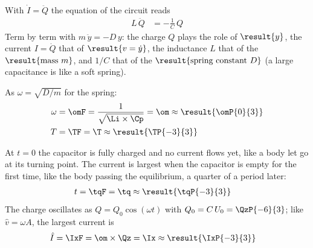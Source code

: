 \begin{abcliste}
\abc With $\dot I = \ddot Q$ the equation of the circuit reads
\begin{align}
 L\,\ddot Q &= -\frac{1}{C}\,Q
\end{align}
Term by term with $m\,\ddot y = -D\,y$: the charge $Q$ plays the role of $\result{y}$, the current $I = \dot Q$ that of $\result{v = \dot y}$, the inductance $L$ that of the $\result{\text{mass } m}$, and $1/C$ that of the $\result{\text{spring constant } D}$ (a large capacitance is like a soft spring).

\abc As $\omega = \sqrt{D/m}$ for the spring:
\begin{align}
 \omega &= \omF = \frac{1}{\sqrt{\Li\times\Cp}} = \om \approx \result{\omP{0}{3}} \\
 T &= \TF = \T \approx \result{\TP{-3}{3}}
\end{align}

\abc At $t = 0$ the capacitor is fully charged and no current flows yet, like a body let go at its turning point. The current is largest when the capacitor is empty for the first time, like the body passing the equilibrium, a quarter of a period later:
\begin{align}
 t &= \tqF = \tq \approx \result{\tqP{-3}{3}}
\end{align}
The charge oscillates as $Q = Q_0\cos(\omega t)$ with $Q_0 = C\,U_0 = \QzP{-6}{3}$; like $\hat v = \omega A$, the largest current is
\begin{align}
 \hat I &= \IxF = \om\times\Qz = \Ix \approx \result{\IxP{-3}{3}}
\end{align}
\end{abcliste}

